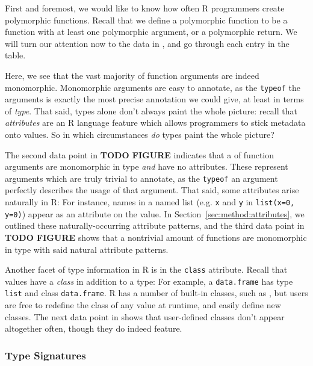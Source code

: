 \documentclass[acmsmall,10pt,review,anonymous]{acmart}\settopmatter{printfolios=true,printccs=false,printacmref=false}
\begin{document}
First and foremost, we would like to know how often R programmers create polymorphic functions.
Recall that we define a polymorphic function to be a function with at least one polymorphic argument, or a polymorphic return.
We will turn our attention now to the data in , and go through each entry in the table.

Here, we see that the vast majority of function arguments are indeed monomorphic.
Monomorphic arguments are easy to annotate, as the {\tt typeof} the arguments is exactly the most precise annotation we could give, at least in terms of \textit{type}.
That said, types alone don't always paint the whole picture:
recall that \textit{attributes} are an R language feature which allows programmers to stick metadata onto values.
So in which circumstances \textit{do} types paint the whole picture?

The second data point in \textbf{TODO FIGURE} indicates that a
 of function arguments are monomorphic in type \textit{and}
have no attributes.  These represent arguments which are truly trivial to
annotate, as the {\tt typeof} an argument perfectly describes the usage of
that argument.  That said, some attributes arise naturally in R: For
instance, names in a named list (e.g. {\tt x} and {\tt y} in {\tt list(x=0,
  y=0)}) appear as an attribute on the value.  In
Section~\ref{sec:method:attributes}, we outlined these naturally-occurring
attribute patterns, and the third data point in \textbf{TODO FIGURE} shows
that a nontrivial amount of functions are monomorphic in type with said
natural attribute patterns.

Another facet of type information in R is in the {\tt class} attribute.
Recall that values have a \textit{class} in addition to a type: For example,
a {\tt data.frame} has type {\tt list} and class {\tt data.frame}.
 R has a number of built-in classes, such as
, but users are free to redefine the class of any value at
runtime, and easily define new classes.  The next data point in
 shows that user-defined classes don't appear altogether often,
though they do indeed feature.  


\subsubsection{Type Signatures}
\end{document}
